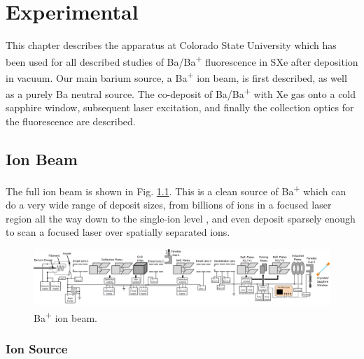 \chapter{Experimental}

This chapter describes the apparatus at Colorado State University which has been used for all described studies of Ba/Ba\textsuperscript{+} fluorescence in SXe after deposition in vacuum.  Our main barium source, a Ba\textsuperscript{+} ion beam, is first described, as well as a purely Ba neutral source.  The co-deposit of Ba/Ba\textsuperscript{+} with Xe gas onto a cold sapphire window, subsequent laser excitation, and finally the collection optics for the fluorescence are described.

\section{Ion Beam}

The full ion beam is shown in Fig. \ref{fig:ionbeam}.  This is a clean source of Ba\textsuperscript{+} which can do a very wide range of deposit sizes, from billions of ions in a focused laser region all the way down to the single-ion level , and even deposit sparsely enough to scan a focused laser over spatially separated ions.

\begin{figure} %
        \centering
                \includegraphics[angle=90,width=.25\textwidth]{figures/ionBeam.png}
                \caption{Ba\textsuperscript{+} ion beam.}
\label{fig:ionbeam}
\end{figure}

\subsection{Ion Source}

